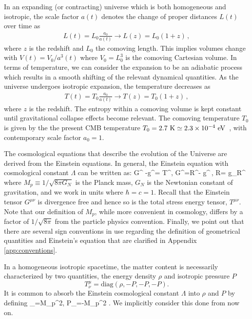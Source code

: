 In an expanding (or contracting) universe which is both homogeneous and isotropic, the scale factor $a(t)$ denotes the change of proper distances $L(t)$ over time as
\begin{gather}
 L(t)=L_{0}\frac{a_{0}}{a(t)}\rightarrow L(z)=L_{0}(1+z)\,,
\end{gather}
where $z$ is the redshift and $L_{0}$ the comoving length.  This implies volumes change with $V(t)=V_{0}/a^{3}(t)$ where $V_{0}=L_{0}^{3}$ is the comoving Cartesian volume. In terms of temperature, we can consider the expansion to be an adiabatic process~\cite{Abdalla:2022yfr} which results in a smooth shifting of the relevant dynamical quantities. As the universe undergoes isotropic expansion, the temperature decreases as 
\begin{gather}
 \label{tscale}
 T(t)=T_{0}\frac{a_{0}}{a(t)}\rightarrow T(z)=T_{0}(1+z)\,,
\end{gather}
where $z$ is the redshift. The entropy within a comoving volume is kept constant until gravitational collapse effects become relevant. The comoving temperature $T_{0}$ is given by the the present CMB temperature $T_{0}=2.7{\rm\ K}\simeq2.3\times10^{-4}\eV$~\cite{Planck:2018vyg}, with contemporary scale factor $a_{0}=1$.

The cosmological equations that describe the evolution of the Universe are derived from the Einstein equations. In general, the Einstein equation with cosmological constant $\Lambda$ can be written as:
\beqn\label{Einstine}
G^{\mu\nu} -\Lambda g^{\mu\nu}= T^{\mu\nu}, \quad G^{\mu\nu}=R^{\mu\nu}- g^{\mu\nu}\,,
\quad R= g_{\mu\nu}R^{\mu\nu}
\eeqn
where $M_p\equiv 1/\sqrt{8\pi G_N}$ is the Planck mass, $G_N$ is the Newtonian constant of gravitation, and we work in units where $\hbar=c=1$. Recall that the Einstein tensor $G^{\mu\nu}$ is divergence free and hence so is the total stress energy tensor, $T^{\mu\nu}$. Note that our definition of $M_p$, while more convenient in cosmology, differs by a factor of $1/\sqrt{8\pi}$ from the particle physics convention. Finally, we point out that there are several sign conventions in use regarding the definition of geometrical quantities and Einstein's equation that are clarified in Appendix \ref{app:conventions}.

 In a homogeneous isotropic spacetime, the matter content is necessarily characterized by two quantities, the energy density $\rho$ and isotropic pressure $P$
\begin{equation}
 T^\mu_\nu =\mathrm{diag}(\rho, -P, -P, -P).
\end{equation}
 It is common to absorb the Einstein cosmological constant $\Lambda$ into $\rho$ and $P$ by defining
\beqn\label{EpsLam}
\rho_\Lambda=M_p^2\Lambda, \qquad P_\Lambda=-M_p^2 \Lambda.
\eeqn
We implicitly consider this done from now on.  



